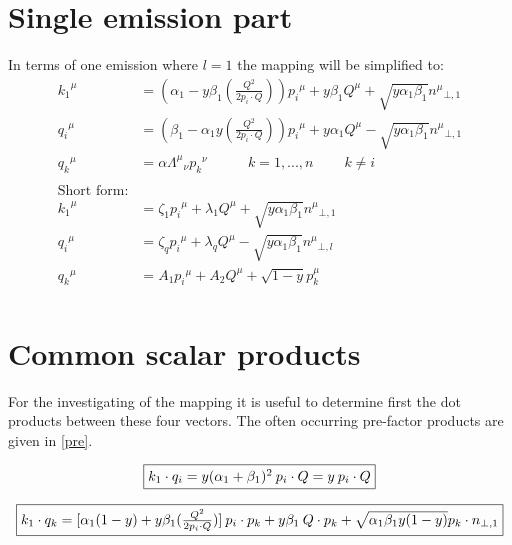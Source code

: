 \section{Single emission part}
In terms of one emission where $ l=1 $ the mapping will be simplified to:
\begin{equation}
	\begin{aligned}
	{k_1}^{\mu} &= (\alpha_1 -y\beta_1(\frac{Q^2}{2p_i \cdot Q})) {p_i}^{\mu} + y\beta_1{Q}^{\mu} + \sqrt{y\alpha_1\beta_1}{n^{\mu}}_{\bot,1}  \\
	{q_i}^{\mu}   &= (\beta_1 -\alpha_1 y(\frac{Q^2}{2p_i \cdot Q})){p_i}^{\mu} + y\alpha_1{Q}^{\mu} - \sqrt{y\alpha_1\beta_1}{n^{\mu}}_{\bot,1} \\
	{q_k}^{\mu} &= \alpha {\Lambda^{\mu}}_{\nu}{p_k}^{\nu} \:\:\:\:\:\:\:\:\:\:\:\:\: {k=1,...,n}\:\:\:\:\:\:\:\:\:\:k\neq i\\
	\\
	\text{Short form:}\\
		{k_1}^{\mu} &= \zeta_1 {p_i}^{\mu} + \lambda_1{Q}^{\mu} + \sqrt{y\alpha_1\beta_1}{n^{\mu}}_{\bot,1}  \\
	{q_i}^{\mu}   &= \zeta_q{p_i}^{\mu} + \lambda_q{Q}^{\mu} - \sqrt{y\alpha_1\beta_1}{n^{\mu}}_{\bot,l} \\
	{q_k}^{\mu} &= A_1{p_i}^{\mu} + A_2{Q}^{\mu} + \sqrt{1-y}{p_k^{\mu}}\\
    \end{aligned}
\end{equation}


\section{Common scalar products}
For the investigating of the mapping it is useful to determine first the dot products between these four vectors. The often occurring pre-factor products are given in \ref{pre}.

\begin{equation}
	\begin{aligned}
		\fbox{$  k_1 \cdot q_i=y({\alpha_1}+\beta_1)^2\:p_i\cdot Q = y\:p_i\cdot Q $}
    \end{aligned}
\label{fistScalarProduct}
\end{equation}

\begin{equation}
	\begin{aligned}
		\fbox{$  k_1 \cdot q_k = [\alpha_1 (1-y)+y\beta_1(\frac{Q^2}{2p_i \cdot Q})]\:p_i \cdot p_k+y\beta_1\:Q\cdot p_k+\sqrt{\alpha_1\beta_1y(1-y)} p_k \cdot {n_{\bot,1}} $}
    \end{aligned}
\end{equation}

